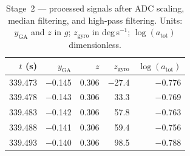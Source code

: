 \documentclass[11pt]{article}
\begin{document}
\begin{table}[h]
\centering
\caption{Stage~1 — raw ADC samples. All ten sensor columns are shown.
\texttt{ax}–\texttt{gz}: accelerometer and gyroscope integer counts;
\texttt{mx}–\texttt{mz}: magnetometer counts (not used by the pipeline);
\texttt{ctr}: packet counter (wraps 0–127).}
\label{tab:stage1}
\end{table}

\begin{table}[h]
\centering
\caption{Stage~2 — processed signals after ADC scaling, median filtering,
and high-pass filtering. Units: $y_{\mathrm{GA}}$ and $z$ in $g$;
$z_{\mathrm{gyro}}$ in deg\,s$^{-1}$; $\log(a_{\mathrm{tot}})$ dimensionless.}
\label{tab:stage2}
\small
\begin{tabular}{rrrrr}
\toprule
$t$ (s) & $y_{\mathrm{GA}}$ & $z$ & $z_{\mathrm{gyro}}$ & $\log(a_{\mathrm{tot}})$ \\
\midrule
339.473 & $-$0.145 & 0.306 & $-$27.4 & $-$0.776 \\
339.478 & $-$0.143 & 0.306 &   33.3 & $-$0.769 \\
339.483 & $-$0.142 & 0.306 &   57.8 & $-$0.763 \\
339.488 & $-$0.141 & 0.306 &   59.4 & $-$0.756 \\
339.493 & $-$0.140 & 0.306 &   98.5 & $-$0.788 \\
\bottomrule
\end{tabular}
\end{table}
\end{document}
